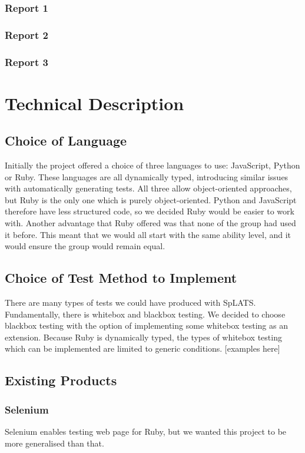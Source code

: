 \documentclass{report}
\begin{document}
\subsection{Report 1}
\subsection{Report 2}
\subsection{Report 3}

\chapter{Technical Description}
\section{Choice of Language}
Initially the project offered a choice of three languages to use: JavaScript, Python or Ruby. These languages are all dynamically typed, introducing similar issues with automatically generating tests. All three allow object-oriented approaches, but Ruby is the only one which is purely object-oriented. Python and JavaScript therefore have less structured code, so we decided Ruby would be easier to work with. Another advantage that Ruby offered was that none of the group had used it before. This meant that we would all start with the same ability level, and it would ensure the group would remain equal.

\section{Choice of Test Method to Implement}
There are many types of tests we could have produced with SpLATS. Fundamentally, there is whitebox and blackbox testing. We decided to choose blackbox testing with the option of implementing some whitebox testing as an extension. Because Ruby is dynamically typed, the types of whitebox testing which can be implemented are limited to generic conditions. [examples here]

\section{Existing Products}
\subsection{Selenium}
Selenium enables testing web page for Ruby, but we wanted this project to be more generalised than that.
\end{document}
